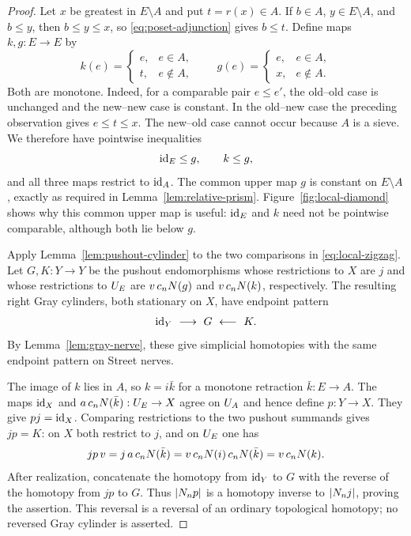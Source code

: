 \begin{proof}
Let $x$ be greatest in $E\setminus A$ and put $t=r(x)\in A$.
If $b\in A$, $y\in E\setminus A$, and $b\le y$, then
$b\le y\le x$, so \eqref{eq:poset-adjunction} gives $b\le t$.
Define maps $k,g:E\to E$ by
\[
 k(e)=\begin{cases}e,&e\in A,\\t,&e\notin A,\end{cases}
 \qquad
 g(e)=\begin{cases}e,&e\in A,\\x,&e\notin A.\end{cases}
\]
Both are monotone.  Indeed, for a comparable pair $e\le e'$, the
old--old case is unchanged and the new--new case is constant.  In the
old--new case the preceding observation gives $e\le t\le x$.
The new--old case cannot occur because $A$ is a sieve.  We therefore
have pointwise inequalities
\begin{equation}\label{eq:local-zigzag}
  \mathrm{id}_E\le g,\qquad k\le g,
\end{equation}
and all three maps restrict to $\mathrm{id}_A$.  The common upper map $g$ is
constant on $E\setminus A$, exactly as required in
Lemma~\ref{lem:relative-prism}.
Figure~\ref{fig:local-diamond} shows why this common upper map is useful:
$\mathrm{id}_E$ and $k$ need not be pointwise comparable, although both lie
below $g$.

Apply Lemma~\ref{lem:pushout-cylinder} to the two comparisons in
\eqref{eq:local-zigzag}.  Let $G,K:Y\to Y$ be the pushout endomorphisms
whose restrictions to $X$ are $j$ and whose restrictions to $U_{E}$
are $v\,c_nN(g)$ and $v\,c_nN(k)$, respectively.  The resulting
right Gray cylinders, both stationary on $X$, have endpoint pattern
\[
  \id_Y\ \longrightarrow\ G\ \longleftarrow\ K.
\]
By Lemma~\ref{lem:gray-nerve}, these give simplicial homotopies with the
same endpoint pattern on Street nerves.

The image of $k$ lies in $A$, so $k=i\bar k$ for a monotone retraction
$\bar k:E\to A$.  The maps $\mathrm{id}_X$ and
$a\,c_nN(\bar k):U_{E}\to X$ agree on $U_{A}$ and hence define
$p:Y\to X$.  They give $pj=\mathrm{id}_X$.  Comparing restrictions to the two
pushout summands gives $jp=K$: on $X$ both restrict to $j$, and on
$U_{E}$ one has
\[
 jp\,v=j\,a\,c_nN(\bar k)
       =v\,c_nN(i)\,c_nN(\bar k)
       =v\,c_nN(k).
\]
After realization, concatenate the homotopy from $\mathrm{id}_Y$ to $G$ with
the reverse of the homotopy from $jp$ to $G$.  Thus $|N_n p|$ is
a homotopy inverse to $|N_n j|$, proving the assertion.  This
reversal is a reversal of an ordinary topological homotopy; no reversed
Gray cylinder is asserted.
\end{proof}


